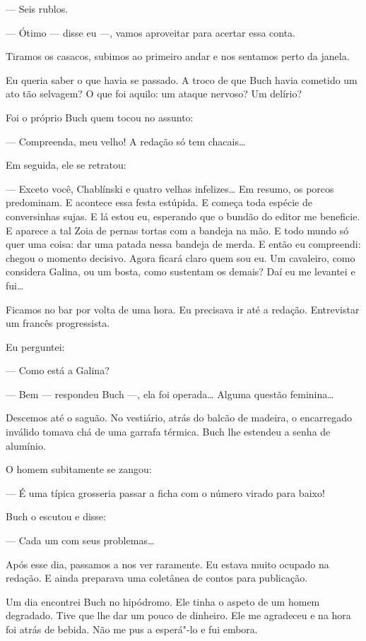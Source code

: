 --- Seis rublos.

--- Ótimo --- disse eu ---, vamos aproveitar para acertar essa conta.

Tiramos os casacos, subimos ao primeiro andar e nos sentamos perto da
janela.

Eu queria saber o que havia se passado. A troco de que Buch havia
cometido um ato tão selvagem? O que foi aquilo: um ataque nervoso? Um
delírio?

Foi o próprio Buch quem tocou no assunto:

--- Compreenda, meu velho! A redação só tem chacais\ldots{}

Em seguida, ele se retratou:

--- Exceto você, Chablínski e quatro velhas infelizes\ldots{} Em resumo, os
porcos predominam. E acontece essa festa estúpida. E começa toda espécie
de conversinhas sujas. E lá estou eu, esperando que o bundão do editor
me beneficie. E aparece a tal Zoia de pernas tortas com a bandeja na
mão. E todo mundo só quer uma coisa: dar uma patada nessa bandeja de
merda. E então eu compreendi: chegou o momento decisivo. Agora ficará
claro quem sou eu. Um cavaleiro, como considera Galina, ou um bosta,
como sustentam os demais? Daí eu me levantei e fui\ldots{}

Ficamos no bar por volta de uma hora. Eu precisava ir até a redação.
Entrevistar um francês progressista.

Eu perguntei:

--- Como está a Galina?

--- Bem --- respondeu Buch ---, ela foi operada\ldots{} Alguma questão
feminina\ldots{}

Descemos até o saguão. No vestiário, atrás do balcão de madeira, o
encarregado inválido tomava chá de uma garrafa térmica. Buch lhe
estendeu a senha de alumínio.

O homem subitamente se zangou:

--- É uma típica grosseria passar a ficha com o número virado para
baixo!

Buch o escutou e disse:

--- Cada um com seus problemas\ldots{}

Após esse dia, passamos a nos ver raramente. Eu estava muito ocupado na
redação. E ainda preparava uma coletânea de contos para publicação.

Um dia encontrei Buch no hipódromo. Ele tinha o aspeto de um homem
degradado. Tive que lhe dar um pouco de dinheiro. Ele me agradeceu e na
hora foi atrás de bebida. Não me pus a esperá"-lo e fui embora.

